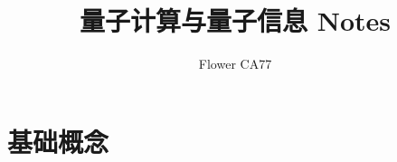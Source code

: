 \documentclass[
    8pt,
    mathfont=none,
    class=book
]{easybook}
\title{量子计算与量子信息 Notes}
\author{Flower CA77}
\date{}
\theoremstyle{default_style}
\begin{document}
\maketitle
\tableofcontents







\part{基础概念}
\end{document}
